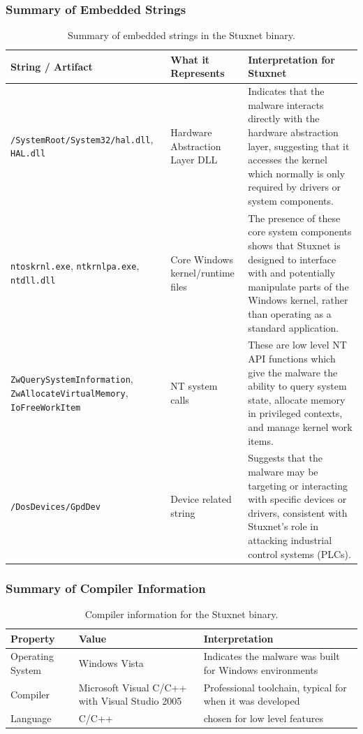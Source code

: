 \documentclass{article}
\begin{document}
\subsubsection{Summary of Embedded Strings}
\begin{table}[H]
  \centering
  \begin{tabular}{|p{5cm}|p{3cm}|p{6cm}|}
    \hline
    \textbf{String / Artifact} & \textbf{What it Represents} & \textbf{Interpretation for Stuxnet} \\
    \hline
    \texttt{/SystemRoot/System32/hal.dll}, \texttt{HAL.dll} & Hardware Abstraction Layer DLL & Indicates that the malware interacts directly with the hardware abstraction layer, suggesting that it accesses the kernel which normally is only required by drivers or system components. \\
    \hline
    \texttt{ntoskrnl.exe}, \texttt{ntkrnlpa.exe}, \texttt{ntdll.dll} & Core Windows kernel/runtime files & The presence of these core system components shows that Stuxnet is designed to interface with and potentially manipulate parts of the Windows kernel, rather than operating as a standard application. \\
    \hline
    \texttt{ZwQuerySystemInformation}, \texttt{ZwAllocateVirtualMemory}, \texttt{IoFreeWorkItem} & NT system calls & These are low level NT API functions which give the malware the ability to query system state, allocate memory in privileged contexts, and manage kernel work items. \\
    \hline
    \texttt{/DosDevices/GpdDev} & Device related string & Suggests that the malware may be targeting or interacting with specific devices or drivers, consistent with Stuxnet’s role in attacking industrial control systems (PLCs). \\
    \hline
  \end{tabular}
  \caption{Summary of embedded strings in the Stuxnet binary.}
  \label{tab:stuxnet-strings}
\end{table}

\subsubsection{Summary of Compiler Information}
\begin{table}[H]
  \centering
  \begin{tabular}{|p{2cm}|p{4cm}|p{6cm}|}
    \hline
    \textbf{Property} & \textbf{Value} & \textbf{Interpretation} \\
    \hline
    Operating System & Windows Vista & Indicates the malware was built for Windows environments \\
    \hline
    Compiler & Microsoft Visual C/C++ with Visual Studio 2005 & Professional toolchain, typical for when it was developed \\
    \hline
    Language & C/C++ & chosen for low level features \\
    \hline
  \end{tabular}
  \caption{Compiler information for the Stuxnet binary.}
  \label{tab:stuxnet-compiler}
\end{table}
\end{document}
